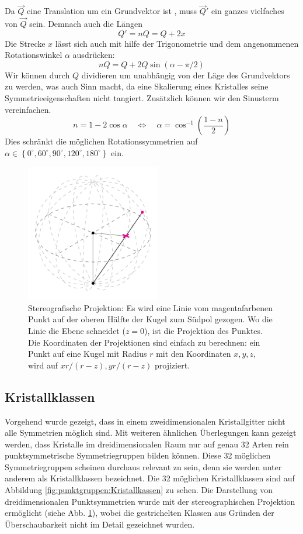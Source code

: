  Da \(\vec{Q}\) eine Translation um ein Grundvektor ist , muss \(\vec{Q}'\) ein ganzes vielfaches von \(\vec{Q}\) sein.
 Demnach auch die Längen
 \[
    Q' = nQ = Q + 2x
 \]
 Die Strecke \(x\) lässt sich auch mit hilfe der Trigonometrie und dem angenommenen Rotationswinkel \(\alpha\) ausdrücken:
 \[
    nQ = Q + 2Q\sin(\alpha - \pi/2)
 \]
 Wir können durch \(Q\) dividieren um unabhängig von der Läge des Grundvektors zu werden, was auch Sinn macht, 
 da eine Skalierung eines Kristalles seine Symmetrieeigenschaften nicht tangiert.
 Zusätzlich können wir den Sinusterm vereinfachen.
 \[
     n = 1 - 2\cos\alpha \quad\iff\quad
     \alpha = \cos^{-1}\left(\frac{1-n}{2}\right)
 \]
 Dies schränkt die möglichen Rotationssymmetrien auf 
 \(
     \alpha \in \left\{ 0^\circ, 60^\circ, 90^\circ, 120^\circ, 180^\circ\right\}
 \)
ein.

\begin{figure}
    \centering
    \includegraphics[height=6cm]{papers/punktgruppen/figures/stereographic-projections}
    \caption{
      Stereografische Projektion: Es wird eine Linie vom magentafarbenen Punkt auf der oberen Hälfte der Kugel zum Südpol gezogen.
      Wo die Linie die Ebene schneidet (\(z = 0\)), ist die Projektion des Punktes.
      Die Koordinaten der Projektionen sind einfach zu berechnen:
      ein Punkt auf eine Kugel mit Radius \(r\) mit den Koordinaten \(x, y, z,\) wird auf \(xr/(r - z), yr/(r - z)\) projiziert.
    }
    \label{fig:punktgruppen:stereographic-projections}
\end{figure}

\subsection{Kristallklassen}
Vorgehend wurde gezeigt, dass in einem zweidimensionalen Kristallgitter nicht alle Symmetrien möglich sind.
Mit weiteren ähnlichen Überlegungen kann gezeigt werden, dass Kristalle im dreidimensionalen Raum
nur auf genau 32 Arten rein punktsymmetrische
Symmetriegruppen bilden können.
Diese 32 möglichen Symmetriegruppen scheinen durchaus relevant zu sein, denn sie werden unter anderem als Kristallklassen bezeichnet.
Die 32 möglichen Kristallklassen sind auf Abbildung \ref{fig:punktgruppen:Kristallkassen} zu sehen.
Die Darstellung von dreidimensionalen Punktsymmetrien wurde mit der stereographischen Projektion ermöglicht (siehe Abb. \ref{fig:punktgruppen:stereographic-projections}), wobei die gestrichelten Klassen aus Gründen der Überschaubarkeit nicht im Detail gezeichnet wurden. 

